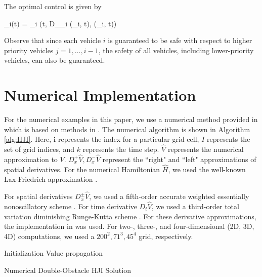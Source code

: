 \documentclass[letterpaper, 10pt, conference]{ieeeconf}      %
\begin{document}
The optimal control is given by

\bq
\label{eq:ctrl_syn}
\ctrl_i(t) = \arg \min \ham_i \left(t, D_{\x_i} \soln(\x_i, t), \soln(\x_i, t)\right)
\eq

Observe that since each vehicle $i$ is guaranteed to be safe with respect to higher priority vehicles $j=1,\ldots,i-1$, the safety of all vehicles, including lower-priority vehicles, can also be guaranteed.

% 
\section{Numerical Implementation \label{sec:example}}
For the numerical examples in this paper, we use a numerical method provided in \cite{fisac15} which is based on methods in \cite{mitchell05, sethian96}. The numerical algorithm is shown in Algorithm \ref{alg:HJI}. Here, $\mathbf{i}$ represents the index for a particular grid cell, $I$ represents the set of grid indices, and $k$ represents the time step.  $\hat{V}$ represents the numerical approximation to $V$. $D^+_x\hat{V}, D^-_x\hat{V}$ represent the ``right" and ``left" approximations of spatial derivatives. For the numerical Hamiltonian $\hat{H}$, we used the well-known Lax-Friedrich approximation \cite{mitchell-thesis, osher91}.

For spatial derivatives $D^\pm_x\hat{V}$, we used a fifth-order accurate weighted essentially nonoscillatory scheme \cite{osher91,osher03}. For time derivative $D_t \hat{V}$, we used a third-order total variation diminishing Runge-Kutta scheme \cite{osher03, shu88}. For these derivative approximations, the implementation in \cite{LSToolbox} was used. For two-, three-, and four-dimensional (2D, 3D, 4D) computations, we used a $200^2, 71^3, 45^4$ grid, respectively.

\begin{algorithm}[h] 
 \BlankLine
 Initialization\DontPrintSemicolon\;\PrintSemicolon
   Value propagation\DontPrintSemicolon\;\PrintSemicolon
 \caption{Numerical Double-Obstacle HJI Solution\label{alg:HJI}}
\end{algorithm}
\end{document}

